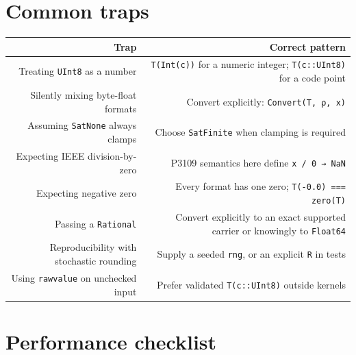 \section{Common traps}



\label{455411289700343066}{}



\begin{table}[h]
\centering
\begin{tabulary}{\linewidth}{R R}
\toprule
Trap & Correct pattern \\
\toprule
Treating \texttt{UInt8} as a number & \texttt{T(Int(c))} for a numeric integer; \texttt{T(c::UInt8)} for a code point \\
Silently mixing byte-float formats & Convert explicitly: \texttt{Convert(T, ρ, x)} \\
Assuming \texttt{SatNone} always clamps & Choose \texttt{SatFinite} when clamping is required \\
Expecting IEEE division-by-zero & P3109 semantics here define \texttt{x / 0 → NaN} \\
Expecting negative zero & Every format has one zero; \texttt{T(-0.0) === zero(T)} \\
Passing a \texttt{Rational} & Convert explicitly to an exact supported carrier or knowingly to \texttt{Float64} \\
Reproducibility with stochastic rounding & Supply a seeded \texttt{rng}, or an explicit \texttt{R} in tests \\
Using \texttt{rawvalue} on unchecked input & Prefer validated \texttt{T(c::UInt8)} outside kernels \\
\bottomrule
\end{tabulary}

\end{table}



\section{Performance checklist}



\label{15543690777485812783}{}


